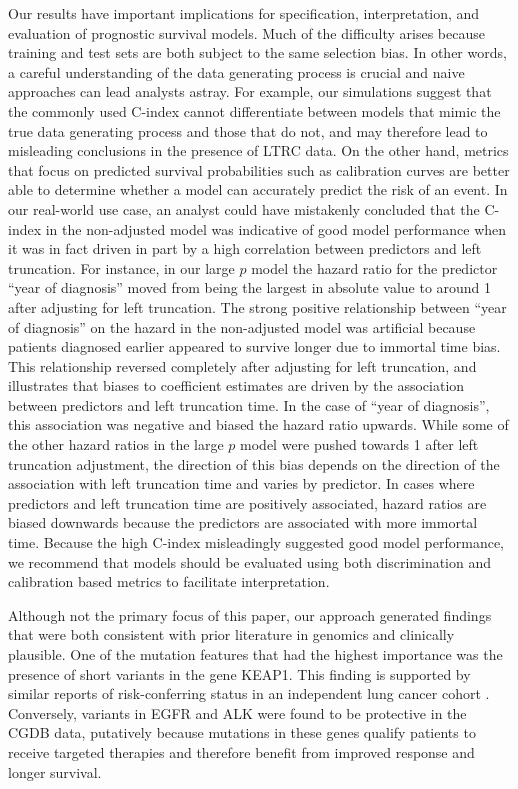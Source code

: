 \documentclass[11pt,final,fleqn]{article}\usepackage[]{graphicx}\usepackage[]{color}
\theoremstyle{plain}
\begin{document}
Our results have important implications for specification, interpretation, and evaluation of prognostic survival models. Much of the difficulty arises because training and test sets are both subject to the same selection bias. In other words, a careful understanding of the data generating process is crucial and naive approaches can lead analysts astray. For example, our simulations suggest that the commonly used C-index cannot differentiate between models that mimic the true data generating process and those that do not, and may therefore lead to misleading conclusions in the presence of LTRC data. On the other hand, metrics that focus on predicted survival probabilities such as calibration curves are better able to determine whether a model can accurately predict the risk of an event.  
In our real-world use case, an analyst could have mistakenly concluded that the C-index in the non-adjusted model was indicative of good model performance when it was in fact driven in part by a high correlation between predictors and left truncation. For instance, in our large $p$ model the hazard ratio for the predictor ``year of diagnosis'' moved from being the largest in absolute value to around 1 after adjusting for left truncation. The strong positive relationship between ``year of diagnosis'' on the hazard in the non-adjusted model was artificial because patients diagnosed earlier appeared to survive longer due to immortal time bias. This relationship reversed completely after adjusting for left truncation, and illustrates that biases to coefficient estimates are driven by the association between predictors and left truncation time. In the case of ``year of diagnosis'', this association was negative and biased the hazard ratio upwards. While some of the other hazard ratios in the large $p$ model were pushed towards 1 after left truncation adjustment, the direction of this bias depends on the direction of the association with left truncation time and varies by predictor. In cases where predictors and left truncation time are positively associated, hazard ratios are biased downwards because the predictors are associated with more immortal time. Because the high C-index misleadingly suggested good model performance, we recommend that models should be evaluated using both discrimination and calibration based metrics to facilitate interpretation.

Although not the primary focus of this paper, our approach generated findings that were both consistent with prior literature in genomics and clinically plausible. One of the mutation features that had the highest importance was the presence of short variants in the gene KEAP1. This finding is supported by similar reports of risk-conferring status in an independent lung cancer cohort \cite{shen_harnessing_2019}. Conversely, variants in EGFR and ALK were found to be protective in the CGDB data, putatively because mutations in these genes qualify patients to receive targeted therapies and therefore benefit from improved response and longer survival.
\end{document}
